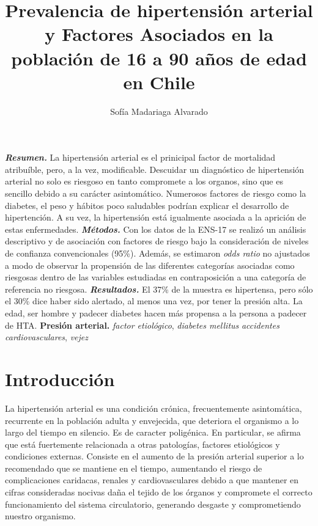 \documentclass{aa}
\begin{document}
\title{Prevalencia de hipertensión arterial y Factores Asociados  en la población de 16 a 90 años de edad en Chile}
\author{Sofía Madariaga Alvarado}

\abstract
{\textbf{\textit{Resumen.}} La hipertensión arterial es el prinicipal factor de mortalidad atribuíble, pero, a la vez, modificable. Descuidar un diagnóstico de hipertensión arterial no solo es riesgoso en tanto compromete a los organos, sino que es sencillo debido a su carácter asintomático. Numerosos factores de riesgo como la diabetes, el peso y hábitos poco saludables podrían explicar el desarrollo de hipertención. A su vez, la hipertensión está igualmente asociada a la aprición de estas enfermedades. \textbf{\textit{Métodos.}} Con los datos de la ENS-17 se realizó un análisis descriptivo y de asociación con factores de riesgo bajo la consideración de niveles de confianza convencionales (95\%). Además, se estimaron \textit{odds ratio} no ajustados a modo de observar la propensión de las diferentes categorías asociadas como riesgosas dentro de las variables estudiadas en contraposición a una categoría de referencia no riesgosa. \textbf{\textit{Resultados.}} El 37\% de la muestra es hipertensa, pero sólo el 30\% dice haber sido alertado, al menos una vez, por tener la presión alta. La edad, ser hombre y padecer diabetes hacen más propensa a la persona a padecer de HTA.
\tiny
\textbf{Presión arterial.} \textit{factor etiológico}, \textit{diabetes mellitus} \textit{accidentes cardiovasculares}, \textit{vejez}
}

\maketitle

\section{Introducción}

La hipertensión arterial es una condición crónica, frecuentemente asintomática, recurrente en la población adulta y envejecida, que deteriora el organismo a lo largo del tiempo en silencio. Es de caracter poligénica. En particular, se afirma que está fuertemente relacionada a otras patologías, factores etiológicos y condiciones externas. Consiste en el aumento de la presión arterial superior a lo recomendado que se mantiene en el tiempo, aumentando el riesgo de complicaciones caridacas, renales y cardiovasculares debido a que mantener en cifras consideradas nocivas daña el tejido de los órganos y compromete el correcto funcionamiento del sistema circulatorio, generando desgaste y comprometiendo nuestro organismo.
\end{document}
